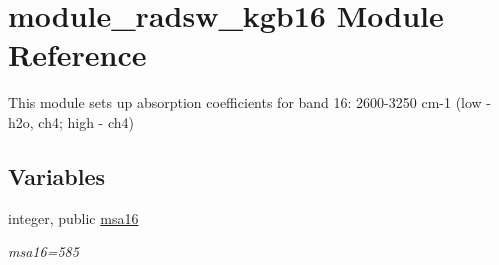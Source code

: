 \hypertarget{namespacemodule__radsw__kgb16}{}\section{module\+\_\+radsw\+\_\+kgb16 Module Reference}
\label{namespacemodule__radsw__kgb16}


This module sets up absorption coefficients for band 16\+: 2600-\/3250 cm-\/1 (low -\/ h2o, ch4; high -\/ ch4)  


\subsection*{Variables}
\begin{DoxyCompactItemize}
\item 
\mbox{\label{namespacemodule__radsw__kgb16_ad76a9d79e77228ac93ec3db96eed2b29}} 
integer, public \hyperlink{namespacemodule__radsw__kgb16_ad76a9d79e77228ac93ec3db96eed2b29}{msa16}
\begin{DoxyCompactList}\small\item\em msa16=585 \end{DoxyCompactList}\end{DoxyCompactItemize}
